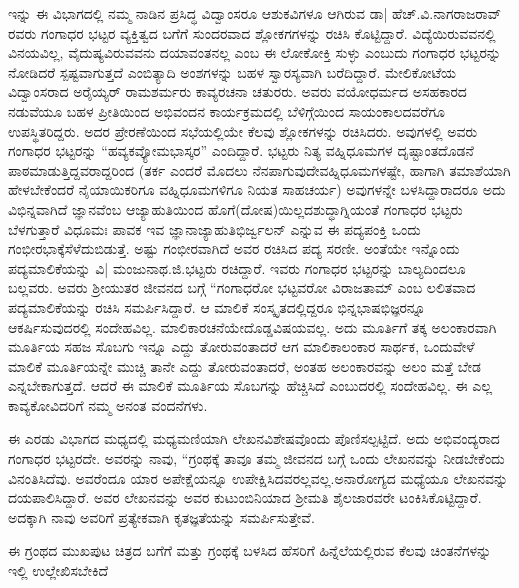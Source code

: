 {ಇನ್ನು ಈ ವಿಭಾಗದಲ್ಲಿ ನಮ್ಮ ನಾಡಿನ ಪ್ರಸಿದ್ಧ ವಿದ್ವಾಂಸರೂ ಆಶುಕವಿಗಳೂ ಆಗಿರುವ ಡಾ| ಹೆಚ್.ವಿ.ನಾಗರಾಜರಾವ್ ರವರು ಗಂಗಾಧರ ಭಟ್ಟರ ವ್ಯಕ್ತಿತ್ವದ ಬಗೆಗೆ ಸುಂದರವಾದ ಶ್ಲೋಕಗಗಳನ್ನು ರಚಿಸಿ ಕೊಟ್ಟಿದ್ದಾರೆ. ವಿದ್ಯೆಯಿರುವವನಲ್ಲಿ ವಿನಯವಿಲ್ಲ, ವೈದುಷ್ಯವಿರುವವನು ದಯಾವಂತನಲ್ಲ ಎಂಬ ಈ ಲೋಕೋಕ್ತಿ ಸುಳ್ಳು ಎಂಬುದು ಗಂಗಾಧರ ಭಟ್ಟರನ್ನು ನೋಡಿದರೆ ಸ್ಪಷ್ಟವಾಗುತ್ತದೆ ಎಂಬಿತ್ಯಾದಿ ಅಂಶಗಳನ್ನು ಬಹಳ ಸ್ವಾರಸ್ಯವಾಗಿ ಬರೆದಿದ್ದಾರೆ. ಮೇಲಿಕೋಟೆಯ ವಿದ್ವಾಂಸರಾದ ಅರೈಯ್ಯರ್ ರಾಮಶರ್ಮರು ಕಾವ್ಯರಚನಾ ಚತುರರು. ಅವರು ವಯೋಧರ್ಮದ ಅಸಹಕಾರದ ನಡುವೆಯೂ ಬಹಳ ಪ್ರೀತಿಯಿಂದ ಅಭಿವಂದನ ಕಾರ್ಯಕ್ರಮದಲ್ಲಿ ಬೆಳಿಗ್ಗೆಯಿಂದ ಸಾಯಂಕಾಲದವರೆಗೂ ಉಪಸ್ಥಿತರಿದ್ದರು. ಅದರ ಪ್ರೇರಣೆಯಿಂದ ಸಭೆಯಲ್ಲಿಯೇ ಕೆಲವು ಶ್ಲೋಕಗಳನ್ನು ರಚಿಸಿದರು. ಅವುಗಳಲ್ಲಿ ಅವರು ಗಂಗಾಧರ ಭಟ್ಟರನ್ನು “ಹವ್ಯಕ\enginline{-}ವ್ಯೋಮಭಾಸ್ಕರ” ಎಂದಿದ್ದಾರೆ. ಭಟ್ಟರು ನಿತ್ಯ ವಹ್ನಿಧೂಮಗಳ ದೃಷ್ಟಾಂತದೊಡನೆ ಪಾಠಮಾಡುತ್ತಿದ್ದವರಾದ್ದರಿಂದ (ತರ್ಕ ಎಂದರೆ ಮೊದಲು ನೆನಪಾಗುವುದೇ\break ವಹ್ನಿಧೂಮಗಳಷ್ಟೇ, ಹಾಗಾಗಿ ತಮಾಶೆಯಾಗಿ ಹೇಳಬೇಕೆಂದರೆ ನೈಯಾಯಿಕರಿಗೂ ವಹ್ನಿಧೂಮಗಳಿಗೂ ನಿಯತ ಸಾಹಚರ್ಯ) ಅವುಗಳನ್ನೇ ಬಳಸಿದ್ದಾರಾದರೂ ಅದು ವಿಭಿನ್ನವಾಗಿದೆ \enginline{-} ಜ್ಞಾನವೆಂಬ ಆಜ್ಯಾಹುತಿಯಿಂದ ಹೊಗೆ(ದೋಷ)ಯಿಲ್ಲದ\break ಶುದ್ಧಾಗ್ನಿಯಂತೆ ಗಂಗಾಧರ ಭಟ್ಟರು ಬೆಳಗುತ್ತಾರೆ \enginline{-} ವಿಧೂಮಃ ಪಾವಕ ಇವ ಜ್ಞಾನಾಜ್ಯಾಹುತಿಭಿರ್ಜ್ವಲನ್ ಎನ್ನುವ ಈ ಪದ್ಯಪಂಕ್ತಿ ಒಂದು ಗಂಭೀರಭಾಕ್ಕೆ\break ಸೆಳೆದುಬಿಡುತ್ತೆ. ಅಷ್ಟು ಗಂಭೀರವಾಗಿದೆ ಅವರ ರಚಿಸಿದ ಪದ್ಯ ಸರಣೀ. ಅಂತೆಯೇ ಇನ್ನೊಂದು ಪದ್ಯಮಾಲಿಕೆಯನ್ನು ವಿ| ಮಂಜುನಾಥ.ಜಿ.ಭಟ್ಟರು ರಚಿದ್ದಾರೆ. ಇವರು ಗಂಗಾಧರ ಭಟ್ಟರನ್ನು ಬಾಲ್ಯದಿಂದಲೂ ಬಲ್ಲವರು. ಅವರು ಶ್ರೀಯುತರ ಜೀವನದ ಬಗ್ಗೆ “ಗಂಗಾಧರೋ  ಭಟ್ಟವರೋ ವಿರಾಜತಾಮ್  ಎಂಬ ಲಲಿತವಾದ ಪದ್ಯ\break ಮಾಲಿಕೆಯನ್ನು ರಚಿಸಿ ಸಮರ್ಪಿಸಿದ್ದಾರೆ. ಆ ಮಾಲಿಕೆ ಸಂಸ್ಕೃತದಲ್ಲಿದ್ದರೂ ಭಿನ್ನ\break ಭಾಷಭಿಜ್ಞರನ್ನೂ ಆಕರ್ಷಿಸುವುದರಲ್ಲಿ ಸಂದೇಹವಿಲ್ಲ. ಮಾಲಿಕಾರಚನೆಯೇ\break ದೊಡ್ಡವಿಷಯವಲ್ಲ. ಅದು ಮೂರ್ತಿಗೆ ತಕ್ಕ ಅಲಂಕಾರವಾಗಿ ಮೂರ್ತಿಯ ಸಹಜ ಸೊಬಗು ಇನ್ನೂ ಎದ್ದು ತೋರುವಂತಾದರೆ ಆಗ ಮಾಲಿಕಾಲಂಕಾರ ಸಾರ್ಥಕ, ಒಂದುವೇಳೆ ಮಾಲಿಕೆ ಮೂರ್ತಿಯನ್ನೇ ಮುಚ್ಚಿ ತಾನೇ ಎದ್ದು ತೋರುವಂತಾದರೆ, ಅಂತಹ ಅಲಂಕಾರವನ್ನು ಅಲಂ \enginline{-} ಮತ್ತೆ ಬೇಡ ಎನ್ನಬೇಕಾಗುತ್ತದೆ. ಆದರೆ ಈ ಮಾಲಿಕೆ ಮೂರ್ತಿಯ ಸೊಬಗನ್ನು ಹೆಚ್ಚಿಸಿದೆ ಎಂಬುದರಲ್ಲಿ ಸಂದೇಹವಿಲ್ಲ. ಈ ಎಲ್ಲ ಕಾವ್ಯಕೋವಿದರಿಗೆ ನಮ್ಮ ಅನಂತ ವಂದನೆಗಳು.

ಈ ಎರಡು ವಿಭಾಗದ ಮಧ್ಯದಲ್ಲಿ ಮಧ್ಯಮಣಿಯಾಗಿ ಲೇಖನವಿಶೇಷವೊಂದು ಪೊಣಿಸಲ್ಪಟ್ಟಿದೆ. ಅದು ಅಭಿವಂದ್ಯರಾದ ಗಂಗಾಧರ ಭಟ್ಟರದೇ. ಅವರನ್ನು ನಾವು, “ಗ್ರಂಥಕ್ಕೆ ತಾವೂ ತಮ್ಮ ಜೀವನದ ಬಗ್ಗೆ ಒಂದು ಲೇಖನವನ್ನು ನೀಡಬೇಕೆಂದು ವಿನಂತಿಸಿದೆವು. ಅವರೆಂದೂ ಯಾರ ಅಪೇಕ್ಷೆಯನ್ನೂ ಉಪೇಕ್ಷಿಸಿದವರಲ್ಲವಲ್ಲ.\break ಅನಾರೋಗ್ಯದ ಮಧ್ಯೆಯೂ ಲೇಖನವನ್ನು ದಯಪಾಲಿಸಿದ್ದಾರೆ. ಅವರ ಲೇಖನವನ್ನು ಅವರ ಕುಟುಂಬಿನಿಯಾದ \enginline{-} ಶ್ರೀಮತಿ ಶೈಲಜಾರವರೇ ಟಂಕಿಸಿಕೊಟ್ಟಿದ್ದಾರೆ. ಅದಕ್ಕಾಗಿ ನಾವು ಅವರಿಗೆ ಪ್ರತ್ಯೇಕವಾಗಿ ಕೃತಜ್ಞತೆಯನ್ನು ಸಮರ್ಪಿಸುತ್ತೇವೆ.

ಈ ಗ್ರಂಥದ ಮುಖಪುಟ ಚಿತ್ರದ ಬಗೆಗೆ ಮತ್ತು ಗ್ರಂಥಕ್ಕೆ ಬಳಸಿದ ಹೆಸರಿಗೆ ಹಿನ್ನೆಲೆಯಲ್ಲಿರುವ ಕೆಲವು ಚಿಂತನೆಗಳನ್ನು ಇಲ್ಲಿ ಉಲ್ಲೇಖಿಸಬೇಕಿದೆ

}
